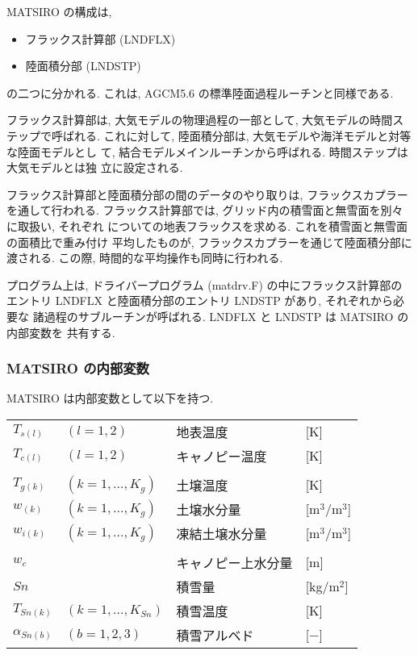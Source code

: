MATSIRO の構成は, 
\begin{itemize}
\item フラックス計算部 (LNDFLX)
\item 陸面積分部 (LNDSTP)
\end{itemize}
の二つに分かれる. 
これは, AGCM5.6 の標準陸面過程ルーチンと同様である. 

フラックス計算部は, 大気モデルの物理過程の一部として, 大気モデルの時間ス
テップで呼ばれる. 
これに対して, 陸面積分部は, 大気モデルや海洋モデルと対等な陸面モデルとし
て, 結合モデルメインルーチンから呼ばれる. 時間ステップは大気モデルとは独
立に設定される. 

フラックス計算部と陸面積分部の間のデータのやり取りは, フラックスカプラー
を通して行われる. 
フラックス計算部では, グリッド内の積雪面と無雪面を別々に取扱い, それぞれ
についての地表フラックスを求める. これを積雪面と無雪面の面積比で重み付け
平均したものが, フラックスカプラーを通じて陸面積分部に渡される. 
この際, 時間的な平均操作も同時に行われる. 

プログラム上は, ドライバープログラム (matdrv.F) の中にフラックス計算部の
エントリ LNDFLX と陸面積分部のエントリ LNDSTP があり, それぞれから必要な
諸過程のサブルーチンが呼ばれる. LNDFLX と LNDSTP は MATSIRO の内部変数を
共有する. 

\subsubsection{MATSIRO の内部変数}

MATSIRO は内部変数として以下を持つ. 

\begin{tabular}{llll}
$T_{s(l)}$      & $(l=1,2)$           & 地表温度 & [K]\\
$T_{c(l)}$      & $(l=1,2)$           & キャノピー温度 & [K]\\
\\
$T_{g(k)}$      & $(k=1,\ldots,K_g)$  & 土壌温度 & [K]\\
$w_{(k)} $      & $(k=1,\ldots,K_g)$  & 土壌水分量 & [m$^3$/m$^3$]\\
$w_{i(k)}$      & $(k=1,\ldots,K_g)$  & 凍結土壌水分量 & [m$^3$/m$^3$]\\
\\
$w_c$         &                     & キャノピー上水分量 & [m]\\
$Sn$          &                     & 積雪量 & [kg/m$^2$]\\      
$T_{Sn(k)}$      & $(k=1,\ldots,K_{Sn})$  & 積雪温度 & [K]\\
$\alpha_{Sn(b)}$ & $(b=1,2,3)$         & 積雪アルベド & [$-$]
\end{tabular}
\medskip

